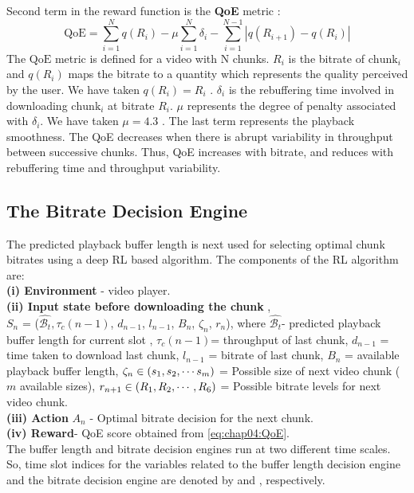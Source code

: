 \indent Second term in the reward function is the \textbf{\ac{QoE}} metric  \cite{yin2015control}:
\begin{equation}\label{eq:chap04:QoE}
   \text{QoE} = \sum_{i=1}^N q(R_i) - \mu\sum_{i=1}^N \delta_i - \sum_{i=1}^{N-1}\left|q(R_{i+1})-q(R_i)\right|
\end{equation}
The $\text{QoE}$ metric is defined for a video with N chunks. $R_i$ is the bitrate of $\text{chunk}_i$ and $q(R_i)$ maps the bitrate to a quantity which represents the quality perceived by the user. We have taken $q(R_i) = R_i$ \cite{mao2017neural}. $\delta_i$ is the rebuffering time involved in downloading $\text{chunk}_i$ at bitrate $R_i$. $\mu$ represents the degree of penalty associated with $\delta_i$.  We have taken $\mu=4.3$ \cite{mao2017neural}. The last term represents the playback smoothness. The QoE decreases when there is abrupt variability in throughput between successive chunks. Thus, QoE increases with bitrate, and reduces with rebuffering time and throughput variability.
\subsection{The Bitrate Decision Engine}
 \label{sec:chap04:bitrate_dec_engine} 
The predicted playback buffer length is next used for selecting optimal chunk bitrates using a deep \ac{RL} based algorithm. The components of the \ac{RL} algorithm are:\\

\noindent\textbf{(i) Environment}   - video player.\\
\noindent\textbf{(ii) Input state before downloading the chunk }, \\$S_{n}$ = ($\hat{\mathcal{B}_t}, \tau_c(n-1)$, $d_{n-1}$, $l_{n-1}$, $B_{n}$, $\zeta_{n}$, $r_{n}$), where $\hat{\mathcal{B}_t}$- predicted playback buffer length for current slot , $\tau_c(n-1)$= throughput of last chunk, $d_{n-1}$ = time taken to download last chunk, $l_{n-1}$ = bitrate of last chunk, $B_{n}$ = available playback buffer length, $\zeta_{n}\in\left({s_1,s_2,\cdots s_m}\right)$ = Possible size of next video chunk  ($m$ available sizes), $r_{n+1}\in \left({R_1, R_2,\cdots, R_6}\right)$ = Possible bitrate levels for next video chunk.\\
\noindent\textbf{(iii) Action} $A_n$ - Optimal bitrate decision for the next chunk.\\ 
\noindent\textbf{(iv) Reward}- QoE score obtained from \eqn\ref{eq:chap04:QoE}.\\
\indent The buffer length and bitrate decision engines run at two different time scales. So, time slot indices for the variables related to the buffer length decision engine and the bitrate decision engine are denoted by   and , respectively.

